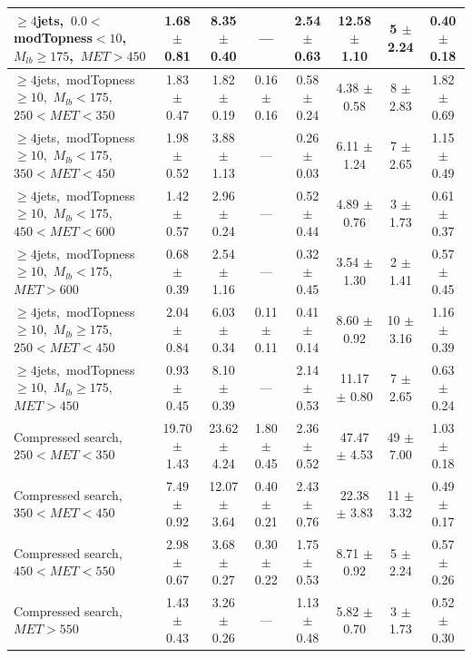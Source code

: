 \begin{table}
\begin{tabular}{|l|c c c c c|c|c|}
$\ge4$jets,~$0.0<$modTopness$<10$,~$M_{lb}\ge175$,~$MET>450$    & 1.68 $\pm$ 0.81  & 8.35 $\pm$ 0.40   &       ---       & 2.54 $\pm$ 0.63  & 12.58 $\pm$ 1.10  & 5 $\pm$ 2.24    & 0.40 $\pm$ 0.18 \\
\hline
$\ge4$jets,~modTopness$\ge10$,~$M_{lb}<175$,~$250<MET<350$      & 1.83 $\pm$ 0.47  & 1.82 $\pm$ 0.19   & 0.16 $\pm$ 0.16 & 0.58 $\pm$ 0.24  & 4.38 $\pm$ 0.58   & 8 $\pm$ 2.83    & 1.82 $\pm$ 0.69 \\
$\ge4$jets,~modTopness$\ge10$,~$M_{lb}<175$,~$350<MET<450$      & 1.98 $\pm$ 0.52  & 3.88 $\pm$ 1.13   &       ---       & 0.26 $\pm$ 0.03  & 6.11 $\pm$ 1.24   & 7 $\pm$ 2.65    & 1.15 $\pm$ 0.49 \\
$\ge4$jets,~modTopness$\ge10$,~$M_{lb}<175$,~$450<MET<600$      & 1.42 $\pm$ 0.57  & 2.96 $\pm$ 0.24   &       ---       & 0.52 $\pm$ 0.44  & 4.89 $\pm$ 0.76   & 3 $\pm$ 1.73    & 0.61 $\pm$ 0.37 \\
$\ge4$jets,~modTopness$\ge10$,~$M_{lb}<175$,~$MET>600$          & 0.68 $\pm$ 0.39  & 2.54 $\pm$ 1.16   &       ---       & 0.32 $\pm$ 0.45  & 3.54 $\pm$ 1.30   & 2 $\pm$ 1.41    & 0.57 $\pm$ 0.45 \\
\hline
$\ge4$jets,~modTopness$\ge10$,~$M_{lb}\ge175$,~$250<MET<450$    & 2.04 $\pm$ 0.84  & 6.03 $\pm$ 0.34   & 0.11 $\pm$ 0.11 & 0.41 $\pm$ 0.14  & 8.60 $\pm$ 0.92   & 10 $\pm$ 3.16   & 1.16 $\pm$ 0.39 \\
$\ge4$jets,~modTopness$\ge10$,~$M_{lb}\ge175$,~$MET>450$        & 0.93 $\pm$ 0.45  & 8.10 $\pm$ 0.39   &       ---       & 2.14 $\pm$ 0.53  & 11.17 $\pm$ 0.80  & 7 $\pm$ 2.65    & 0.63 $\pm$ 0.24 \\
\hline
Compressed search, $250<MET<350$  & 19.70 $\pm$ 1.43  & 23.62 $\pm$ 4.24  & 1.80 $\pm$ 0.45  & 2.36 $\pm$ 0.52  & 47.47 $\pm$ 4.53  & 49 $\pm$ 7.00  & 1.03 $\pm$ 0.18 \\*
Compressed search, $350<MET<450$  & 7.49 $\pm$ 0.92  & 12.07 $\pm$ 3.64  & 0.40 $\pm$ 0.21  & 2.43 $\pm$ 0.76  & 22.38 $\pm$ 3.83  & 11 $\pm$ 3.32  & 0.49 $\pm$ 0.17 \\*
Compressed search, $450<MET<550$  & 2.98 $\pm$ 0.67  & 3.68 $\pm$ 0.27  & 0.30 $\pm$ 0.22  & 1.75 $\pm$ 0.53  & 8.71 $\pm$ 0.92  & 5 $\pm$ 2.24  & 0.57 $\pm$ 0.26 \\*
Compressed search, $MET>550$      & 1.43 $\pm$ 0.43  & 3.26 $\pm$ 0.26  & ---  & 1.13 $\pm$ 0.48  & 5.82 $\pm$ 0.70  & 3 $\pm$ 1.73  & 0.52 $\pm$ 0.30 \\*
\hline
\end{tabular}
\end{table}

